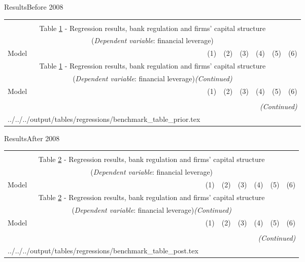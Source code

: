\documentclass{beamer}
\makeatletter
\newcommand\primitiveinput[1]
{\@@input #1 }
\makeatother
\begin{document}
\begin{frame}{Results}{Before 2008}

{\fontsize{6}{7}\selectfont		
	\begin{longtable}{lcccccc}\\
		\label{reg:prior}\\
		\multicolumn{7}{c}{Table \ref{reg:prior} - Regression results, bank regulation and firms' capital structure}\\
		\multicolumn{7}{c}{(\textit{Dependent variable}: financial leverage)}
		\\ \hline \hline \addlinespace
		Model & (1) & (2) & (3) & (4) & (5) & (6) \\  \endfirsthead
		\multicolumn{7}{c}{Table \ref{reg:prior} - Regression results, bank regulation and firms' capital structure }\\
		\multicolumn{7}{c}{(\textit{Dependent variable}: financial leverage)\textit{(Continued)}}
		\\ \hline \hline \addlinespace Model & (1) & (2) & (3) & (4) & (5) & (6) \\ \hline \\ \endhead
		\hline
		\multicolumn{7}{r}{{\textit{(Continued)}}}\\ \endfoot 
		\endlastfoot
		\primitiveinput{../../../output/tables/regressions/benchmark_table_prior.tex}
		\hline 			
	\end{longtable}		
}

\end{frame}

\begin{frame}{Results}{After 2008}

{\fontsize{6}{7}\selectfont		
	\begin{longtable}{lcccccc}\\
		\label{reg:post}\\
		\multicolumn{7}{c}{Table \ref{reg:post} - Regression results, bank regulation and firms' capital structure}\\
		\multicolumn{7}{c}{(\textit{Dependent variable}: financial leverage)}
		\\ \hline \hline \addlinespace
		Model & (1) & (2) & (3) & (4) & (5) & (6) \\  \endfirsthead
		\multicolumn{7}{c}{Table \ref{reg:post} - Regression results, bank regulation and firms' capital structure }\\
		\multicolumn{7}{c}{(\textit{Dependent variable}: financial leverage)\textit{(Continued)}}
		\\ \hline \hline \addlinespace Model & (1) & (2) & (3) & (4) & (5) & (6) \\ \hline \\ \endhead
		\hline
		\multicolumn{7}{r}{{\textit{(Continued)}}}\\ \endfoot 
		\endlastfoot
		\primitiveinput{../../../output/tables/regressions/benchmark_table_post.tex}
		\hline 			
	\end{longtable}		
}

\end{frame}
\end{document}
